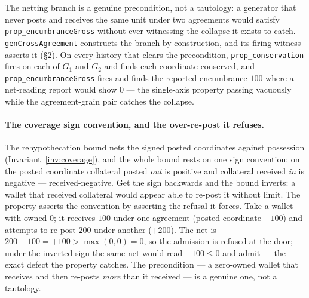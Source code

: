 \documentclass[11pt,a4paper]{article}
\begin{document}
The netting branch is a genuine precondition, not a tautology: a generator that never posts
and receives the same unit under two agreements would satisfy \texttt{prop\_encumbranceGross}
without ever witnessing the collapse it exists to catch. \texttt{genCrossAgreement} constructs
the branch by construction, and its firing witness asserts it (\S 2). On every history that
clears the precondition, \texttt{prop\_conservation} fires on each of $G_1$ and $G_2$ and
finds each coordinate conserved, and \texttt{prop\_encumbranceGross} fires and finds the
reported encumbrance $100$ where a net-reading report would show $0$ --- the single-axis
property passing vacuously while the agreement-grain pair catches the collapse.

\paragraph{The coverage sign convention, and the over-re-post it refuses.}
The rehypothecation bound nets the signed posted coordinates against possession
(Invariant~\ref{inv:coverage}), and the whole bound rests on one sign convention: on
the posted coordinate collateral posted \emph{out} is positive and collateral
received \emph{in} is negative --- received-negative. Get the sign backwards and the
bound inverts: a wallet that received collateral would appear able to re-post it
without limit. The property asserts the convention by asserting the refusal it
forces. Take a wallet with owned $0$; it receives $100$ under one agreement (posted
coordinate $-100$) and attempts to re-post $200$ under another ($+200$). The net is
$200-100=+100>\max(0,0)=0$, so the admission is refused at the door; under the
inverted sign the same net would read $-100\le 0$ and admit --- the exact defect the
property catches. The precondition --- a zero-owned wallet that receives and then
re-posts \emph{more} than it received --- is a genuine one, not a tautology.
\end{document}
